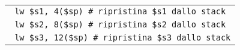 \documentclass[../main.tex]{subfiles}
\begin{document}
\begin{tabular}{ l }
    \texttt{\hspace*{0cm} \hspace*{0cm} \hspace*{0cm} \hspace*{0cm} \hspace*{0cm} \hspace*{0cm} \hspace*{0cm} \hspace*{0cm} \hspace*{0cm} lw \$s1, 4(\$sp) \hspace*{0cm} \hspace*{0cm} \hspace*{0cm} \hspace*{0cm} \hspace*{0cm} \hspace*{0cm} \hspace*{0cm} \hspace*{0cm} \# ripristina \$s1 dallo stack} \\
    \texttt{\hspace*{0cm} \hspace*{0cm} \hspace*{0cm} \hspace*{0cm} \hspace*{0cm} \hspace*{0cm} \hspace*{0cm} \hspace*{0cm} \hspace*{0cm} lw \$s2, 8(\$sp) \hspace*{0cm} \hspace*{0cm} \hspace*{0cm} \hspace*{0cm} \hspace*{0cm} \hspace*{0cm} \hspace*{0cm} \hspace*{0cm} \# ripristina \$s2 dallo stack} \\
    \texttt{\hspace*{0cm} \hspace*{0cm} \hspace*{0cm} \hspace*{0cm} \hspace*{0cm} \hspace*{0cm} \hspace*{0cm} \hspace*{0cm} \hspace*{0cm} lw \$s3, 12(\$sp) \hspace*{0cm} \hspace*{0cm} \hspace*{0cm} \hspace*{0cm} \hspace*{0cm} \hspace*{0cm} \hspace*{0cm} \# ripristina \$s3 dallo stack} \\

\end{tabular}
\end{document}
